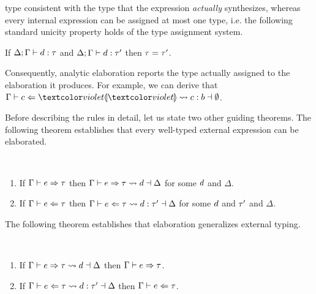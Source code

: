 type consistent with the type that the expression \emph{actually}
synthesizes, whereas every internal expression can be assigned at most one
type, i.e. the following standard unicity property holds of the type
assignment system.
%
\begin{thm}
  If $\Delta; \Gamma \vdash d : \tau$
  and $\Delta; \Gamma \vdash d : \tau'$
  then $\tau=\tau'$.
\end{thm}
\noindent
Consequently, analytic elaboration reports the type actually assigned to
the elaboration it produces.
%
For example, we can derive that
$\elabAna{\hGamma}{c}{\tehole}{c}{b}{\emptyset}$.

Before describing the rules in detail, let us state two other guiding
theorems.  The following theorem establishes that every well-typed external
expression can be elaborated.
 \begin{thm}[Elaborability] \label{thm:elaborability}~
  \begin{enumerate}[nolistsep]
    \item
      If $\Gamma \vdash e \Rightarrow \tau$
      then $\Gamma \vdash e \Rightarrow \tau \leadsto d \dashv \Delta$
      for some $d$ and $\Delta$.
    \item
      If $\Gamma \vdash e \Leftarrow \tau$
      then $\Gamma \vdash e \Leftarrow \tau \leadsto d : \tau' \dashv \Delta$
      for some $d$ and $\tau'$ and $\Delta$.
  \end{enumerate}
 \end{thm}

\noindent
The following theorem establishes that elaboration generalizes external
typing.
\begin{thm} \label{thm:elaboration-generality}~
  \begin{enumerate}[nolistsep]
    \item
      If $\Gamma \vdash e \Rightarrow \tau \leadsto d \dashv \Delta$
      then $\Gamma \vdash e \Rightarrow \tau$.
    \item
      If $\Gamma \vdash e \Leftarrow \tau \leadsto d : \tau' \dashv \Delta$
      then $\Gamma \vdash e \Leftarrow \tau$.
  \end{enumerate}
\end{thm}

